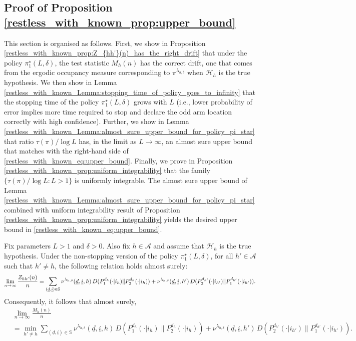 \subsection{Proof of Proposition \ref{restless_with_known_prop:upper_bound}}\label{restless_with_known_appndx:proof_of_upper_bound}
This section is organised as follows. First, we show in Proposition \ref{restless_with_known_prop:Z_{hh'}(n)_has_the_right_drift} that under the policy $\pi_1^\star(L,\delta)$, the test statistic $M_h(n)$ has the correct drift, one that comes from the ergodic occupancy measure corresponding to $\pi^{\lambda_{h,\delta}}$ when $\mathcal{H}_h$ is the true hypothesis. We then show in Lemma \ref{restless_with_known_Lemma:stopping_time_of_policy_goes_to_infinity} that the stopping time of the policy $\pi_1^\star(L,\delta)$ grows with $L$ (i.e., lower probability of error implies more time required to stop and declare the odd arm location correctly with high confidence). Further, we show in Lemma \ref{restless_with_known_Lemma:almost_sure_upper_bound_for_policy_pi_star} that ratio $\tau(\pi)/\log L$ has, in the limit as $L\to\infty$, an almost sure upper bound that matches with the right-hand side of \eqref{restless_with_known_eq:upper_bound}. Finally, we prove in Proposition \ref{restless_with_known_prop:uniform_integrability} that the family $\{\tau(\pi)/\log L:L>1\}$ is uniformly integrable. The almost sure upper bound of Lemma \ref{restless_with_known_Lemma:almost_sure_upper_bound_for_policy_pi_star} combined with uniform integrability result of Proposition \ref{restless_with_known_prop:uniform_integrability} yields the desired upper bound in \eqref{restless_with_known_eq:upper_bound}.

\begin{prop}\label{restless_with_known_prop:Z_{hh'}(n)_has_the_right_drift}
	Fix parameters $L>1$ and $\delta>0$. Also fix $h\in\mathcal{A}$ and assume that $\mathcal{H}_h$ is the true hypothesis. Under the non-stopping version of the policy $\pi_1^\star(L,\delta)$, for all $h'\in \mathcal{A}$ such that $h'\neq h$, the following relation holds almost surely:
	\begin{equation}
		\lim\limits_{n\to\infty}\frac{Z_{hh'}(n)}{n}=\sum\limits_{(\underline{d},\underline{i})\in\mathbb{S}}\nu^{\lambda_{h,\delta}}(\underline{d},\underline{i},h)\,D(P_1^{d_h}(\cdot|i_h)\|P_2^{d_{h}}(\cdot|i_h))+\nu^{\lambda_{h,\delta}}(\underline{d},\underline{i},h')\,D(P_2^{d_{h'}}(\cdot|i_{h'})\|P_1^{d_{h'}}(\cdot|i_{h'})).\label{restless_with_known_eq:limit_Z_{hh'}(n)/n}
	\end{equation}
	Consequently, it follows that almost surely,
	\begin{align}
		&\lim\limits_{n\to\infty}\frac{M_h(n)}{n}\nonumber\\
		&=\min\limits_{h'\neq h}\sum\limits_{(\underline{d},\underline{i})\in\mathbb{S}}\nu^{\lambda_{h,\delta}}(\underline{d},\underline{i},h)\,D(P_1^{d_h}(\cdot|i_h)\|P_2^{d_{h}}(\cdot|i_h))+\nu^{\lambda_{h,\delta}}(\underline{d},\underline{i},h')\,D(P_2^{d_{h'}}(\cdot|i_{h'})\|P_1^{d_{h'}}(\cdot|i_{h'})).\label{restless_with_known_eq:limit_M_h(n)/n}
	\end{align}
\end{prop}

